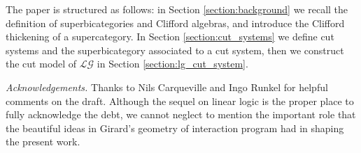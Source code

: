 \documentclass[english,letter paper,12pt,leqno]{article}
\theoremstyle{example}
\numberwithin{equation}{section}
\def\LG{\mathcal{LG}}
\begin{document}




\medskip

The paper is structured as follows: in Section \ref{section:background} we recall the definition of superbicategories and Clifford algebras, and introduce the Clifford thickening of a supercategory. In Section \ref{section:cut_systems} we define cut systems and the superbicategory associated to a cut system, then we construct the cut model of $\LG$ in Section \ref{section:lg_cut_system}.

\medskip

\emph{Acknowledgements.} Thanks to Nils Carqueville and Ingo Runkel for helpful comments on the draft. Although the sequel on linear logic is the proper place to fully acknowledge the debt, we cannot neglect to mention the important role that the beautiful ideas in Girard's geometry of interaction program \cite{girard_towards} had in shaping the present work.
\end{document}

